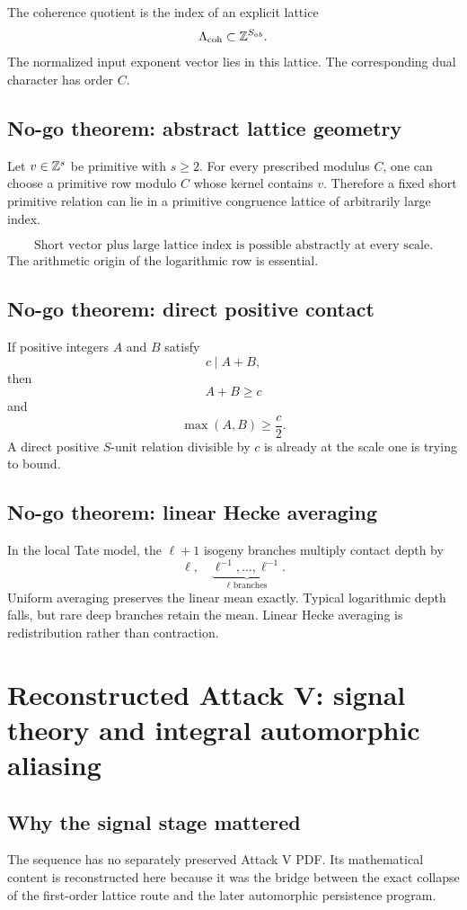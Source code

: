 The coherence quotient is the index of an explicit lattice
\[
\Lambda_{\mathrm{coh}}
\subset
\mathbb Z^{S_{ab}}.
\]
The normalized input exponent vector lies in this lattice. The corresponding dual character has order $C$.

\section{No-go theorem: abstract lattice geometry}
Let $v\in\mathbb Z^s$ be primitive with $s\ge2$. For every prescribed modulus $C$, one can choose a primitive row modulo $C$ whose kernel contains $v$. Therefore a fixed short primitive relation can lie in a primitive congruence lattice of arbitrarily large index.

\[
\boxed{
\text{Short vector plus large lattice index is possible abstractly at every scale.}
}
\]
The arithmetic origin of the logarithmic row is essential.

\section{No-go theorem: direct positive contact}
If positive integers $A$ and $B$ satisfy
\[
c\mid A+B,
\]
then
\[
A+B\ge c
\]
and
\[
\boxed{
\max(A,B)\ge\frac c2.
}
\]
A direct positive $S$-unit relation divisible by $c$ is already at the scale one is trying to bound.

\section{No-go theorem: linear Hecke averaging}
In the local Tate model, the $\ell+1$ isogeny branches multiply contact depth by
\[
\ell,
\quad
\underbrace{\ell^{-1},\ldots,\ell^{-1}}_{\ell\text{ branches}}.
\]
Uniform averaging preserves the linear mean exactly. Typical logarithmic depth falls, but rare deep branches retain the mean. Linear Hecke averaging is redistribution rather than contraction.

\chapter{Reconstructed Attack V: signal theory and integral automorphic aliasing}

\section{Why the signal stage mattered}
The sequence has no separately preserved Attack V PDF. Its mathematical content is reconstructed here because it was the bridge between the exact collapse of the first-order lattice route and the later automorphic persistence program.

